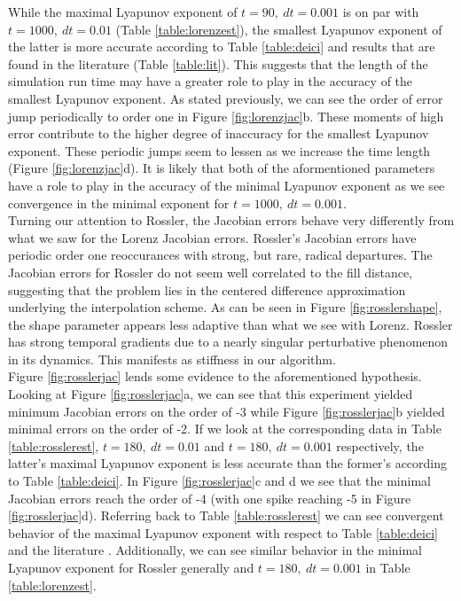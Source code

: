             While the maximal Lyapunov exponent of $t=90, \ dt=0.001$ is on par with $t=1000, \ dt=0.01$ (Table \ref{table:lorenzest}), the smallest
            Lyapunov exponent of the latter is more accurate according to Table \ref{table:deici} and results that are
            found in the literature (Table \ref{table:lit}). This suggests that the length of the simulation run time may have a
            greater role to play in the accuracy of the smallest Lyapunov exponent. As stated previously, we can see the order of error jump periodically
            to order one in Figure \ref{fig:lorenzjac}b. These moments of
            high error contribute to the higher degree of inaccuracy for the smallest Lyapunov exponent. These periodic jumps seem to lessen
            as we increase the time length (Figure \ref{fig:lorenzjac}d).
            It is likely that both of the aformentioned parameters have a role to play in the accuracy of the minimal
            Lyapunov exponent as we see convergence in the minimal exponent for $t=1000, \ dt=0.001$.\\

            Turning our attention to
            Rossler, the Jacobian errors behave very differently from what
            we saw for the Lorenz Jacobian errors. Rossler's Jacobian errors have periodic order one reoccurances with strong, but rare,
            radical departures. The Jacobian errors for Rossler do not seem well correlated to the fill distance, suggesting
            that the problem lies in the centered difference approximation underlying the interpolation scheme. As can be seen
            in Figure \ref{fig:rosslershape}, the shape parameter appears less adaptive than what we see with Lorenz. Rossler
            has strong temporal gradients due to a nearly singular perturbative phenomenon in its dynamics. This manifests
            as stiffness in our algorithm.\\

            Figure \ref{fig:rosslerjac} lends some evidence to the aforementioned hypothesis. Looking at Figure \ref{fig:rosslerjac}a,
            we can see that this experiment yielded minimum Jacobian errors on the order of -3 while Figure \ref{fig:rosslerjac}b yielded
            minimal errors on the order of -2. If we look at the corresponding data in Table \ref{table:rosslerest}, $t=180, \ dt=0.01$
            and $t=180, \ dt=0.001$ respectively, the latter's maximal Lyapunov exponent is less accurate than the former's
            according to Table \ref{table:deici}. In Figure \ref{fig:rosslerjac}c and d we see that the minimal Jacobian errors
            reach the order of -4 (with one spike reaching -5 in Figure \ref{fig:rosslerjac}d). Referring back to Table \ref{table:rosslerest}
            we can see convergent behavior of the maximal Lyapunov exponent with respect to Table \ref{table:deici} and the
            literature \cite{item:8}. Additionally, we can see similar behavior in the minimal Lyapunov exponent for Rossler
            generally and $t=180, \ dt=0.001$ in Table \ref{table:lorenzest}.\\

